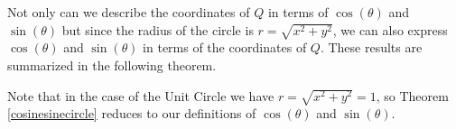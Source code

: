\bigskip



\smallskip

Not only can we describe the coordinates of $Q$ in terms of $\cos(\theta)$ and $\sin(\theta)$ but since the radius of the circle is $r = \sqrt{x^2 + y^2}$, we can also express $\cos(\theta)$ and $\sin(\theta)$ in terms of the coordinates of $Q$.  These results are summarized in the following theorem.

\smallskip


\smallskip

Note that in the case of the Unit Circle we have $r = \sqrt{x^2+y^2} = 1$, so Theorem \ref{cosinesinecircle} reduces to our definitions of $\cos(\theta)$ and $\sin(\theta)$.

\medskip

